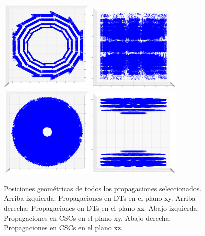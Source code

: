 \begin{figure}
\centering
\includegraphics[width=0.4\textwidth]{figures/Props_DT_xy.png}
\includegraphics[width=0.4\textwidth]{figures/Props_DT_xz.png}
\includegraphics[width=0.4\textwidth]{figures/Props_CSC_xy.png}
\includegraphics[width=0.4\textwidth]{figures/Props_CSC_xz.png}
\caption{Posiciones geom\'etricas de todos los propagaciones seleccionados. Arriba izquierda: Propagaciones en DTs en el plano xy. Arriba derecha: Propagaciones en DTs en el plano xz. Abajo izquierda: Propagaciones en CSCs en el plano xy. Abajo derecha: Propagaciones en CSCs en el plano xz.}
\label{fig:props_pos}
\end{figure}

